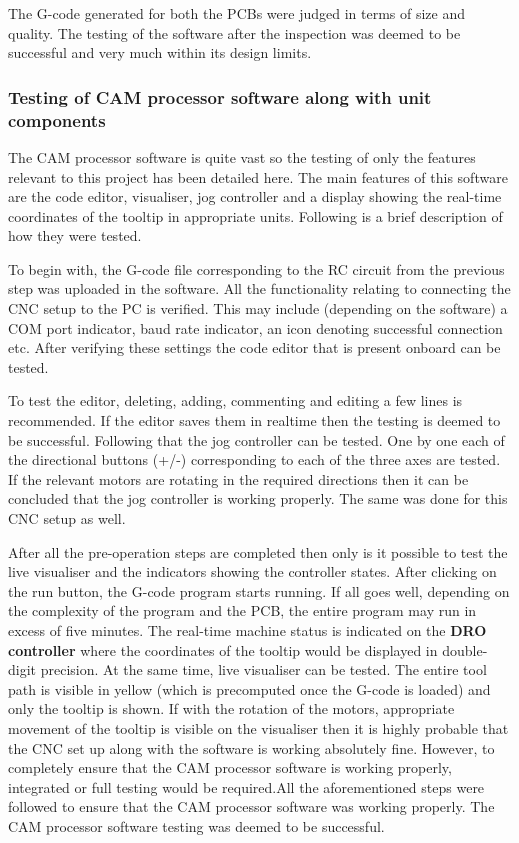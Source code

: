 The G-code generated for both the PCBs were judged in terms of size and quality. The testing of the software after the inspection was deemed to be successful and very much within its design limits.

\subsubsection*{Testing of CAM processor software along with unit components}

The CAM processor software is quite vast so the testing of only the features relevant to this project has been detailed here. The main features of this software are the code editor, visualiser, jog controller and a display showing the real-time coordinates of the tooltip in appropriate units. Following is a brief description of how they were tested. \par

To begin with, the G-code file corresponding to the RC circuit from the previous step was uploaded in the software. All the functionality relating to connecting the CNC setup to the PC is verified. This may include (depending on the software) a COM port indicator, baud rate indicator, an icon denoting successful connection etc. After verifying these settings the code editor that is present onboard can be tested. \par

To test the editor, deleting, adding, commenting and editing a few lines is recommended. If the editor saves them in realtime then the testing is deemed to be successful. Following that the jog controller can be tested. One by one each of the directional buttons (+/-) corresponding to each of the three axes are tested. If the relevant motors are rotating in the required directions then it can be concluded that the jog controller is working properly. The same was done for this CNC setup as well. \par

After all the pre-operation steps are completed then only is it possible to test the live visualiser and the indicators showing the controller states. After clicking on the run button, the G-code program starts running. If all goes well, depending on the complexity of the program and the PCB, the entire program may run in excess of five minutes. The real-time machine status is indicated on the \textbf{DRO controller} where the coordinates of the tooltip would be displayed in double-digit precision. At the same time, live visualiser can be tested. The entire tool path is visible in yellow (which is precomputed once the G-code is loaded) and only the tooltip is shown. If with the rotation of the motors, appropriate movement of the tooltip is visible on the visualiser then it is highly probable that the CNC set up along with the software is working absolutely fine. However, to completely ensure that the CAM processor software is working properly, integrated or full testing would be required.All the aforementioned steps were followed to ensure that the CAM processor software was working properly. The CAM processor software testing was deemed to be successful.


